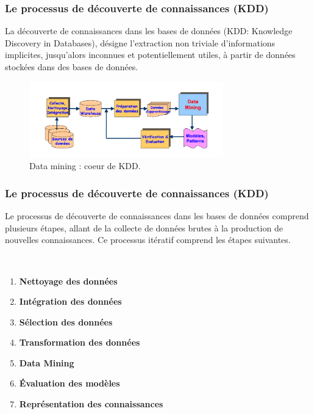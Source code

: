 \documentclass{beamer}
\begin{document}
      \begin{frame}
          \frametitle{Le processus de découverte de connaissances (KDD)}
          La découverte de connaissances dans les bases de données (KDD: Knowledge Discovery in Databases), désigne l'extraction non triviale d'informations implicites, jusqu'alors inconnues et potentiellement utiles, à partir de données stockées dans des bases de données.

          \begin{figure}[]
            \centering
            \includegraphics[width=0.75\textwidth]{images/KDD_data_mining.png}
            \caption{Data mining : coeur de KDD.}
            \label{fig:mesh1}
        \end{figure}   
      \end{frame} 
      \begin{frame}
          \frametitle{Le processus de découverte de connaissances (KDD)}
          Le processus de découverte de connaissances dans les bases de données comprend plusieurs étapes, allant de la collecte de données brutes à la production de nouvelles connaissances. Ce processus itératif comprend les étapes suivantes.

          \\
          \begin{enumerate}
            \item \textbf{Nettoyage des données}
            \item \textbf{Intégration des données}
            \item \textbf{Sélection des données} 
            \item \textbf{Transformation des données}
            \item \textbf{Data Mining}
            \item \textbf{Évaluation des modèles}
            \item \textbf{Représentation des connaissances}
           
          \end{enumerate}
           
      \end{frame} 
\end{document}
